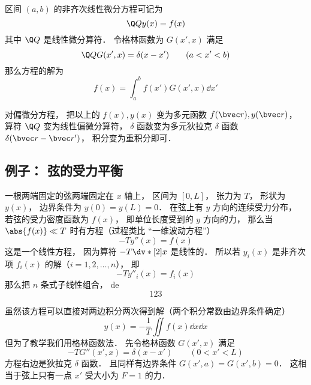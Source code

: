 
\begin{issues}
\issueDraft
\end{issues}


区间 $(a,b)$ 的非齐次线性微分方程可记为
\begin{equation}
\Q Q y(x) = f(x)
\end{equation}
其中 $\Q Q$ 是线性微分算符． 令格林函数为 $G(x', x)$ 满足
\begin{equation}
\Q Q G(x', x) = \delta(x - x') \qquad (a < x' < b)
\end{equation}
那么方程的解为
\begin{equation}
f(x) = \int_a^b f(x') G(x', x) \dd{x'}
\end{equation}

对偏微分方程， 把以上的 $f(x), y(x)$ 变为多元函数 $f(\bvec r), y(\bvec r)$， 算符 $\Q Q$ 变为线性偏微分算符， $\delta$ 函数变为多元狄拉克 $\delta$ 函数 $\delta(\bvec r - \bvec r')$， 积分变为重积分即可．

\subsection{例子： 弦的受力平衡}
一根两端固定的弦两端固定在 $x$ 轴上， 区间为 $[0, L]$， 张力为 $T$， 形状为 $y(x)$， 边界条件为 $y(0) = y(L) = 0$． 在弦上有 $y$ 方向的连续受力分布， 若弦的受力密度函数为 $f(x)$， 即单位长度受到的 $y$ 方向的力， 那么当 $\abs{f(x)} \ll T$ 时有方程（过程类比 “一维波动方程”）
\begin{equation}\label{GreenF_eq1}
-T y''(x) = f(x)
\end{equation}
这是一个线性方程， 因为算符 $-T\dv*[2]{x}$ 是线性的． 所以若 $y_i(x)$ 是非齐次项 $f_i(x)$ 的解（$i = 1,2,\dots, n$）， 即
\begin{equation}
-T y''_i(x) = f_i(x)
\end{equation}
那么把 $n$ 条式子线性组合， de
\begin{equation}
123
\end{equation}

虽然该方程可以直接对两边积分两次得到解（两个积分常数由边界条件确定）
\begin{equation}
y(x) = -\frac{1}{T}\iint f(x) \dd{x}\dd{x}
\end{equation}
但为了教学我们用格林函数法． 先令格林函数 $G(x', x)$ 满足
\begin{equation}\label{GreenF_eq2}
-T G''(x', x) = \delta(x - x') \qquad (0 < x' < L)
\end{equation}
方程右边是狄拉克 $\delta$ 函数． 且同样有边界条件 $G(x', a) = G(x', b) = 0$． 这相当于弦上只有一点 $x'$ 受大小为 $F = 1$ 的力．

